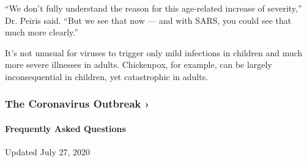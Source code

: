 ``We don't fully understand the reason for this age-related increase of
severity,'' Dr. Peiris said. ``But we see that now --- and with SARS,
you could see that much more clearly.''

It's not unusual for viruses to trigger only mild infections in children
and much more severe illnesses in adults. Chickenpox, for example, can
be largely inconsequential in children, yet catastrophic in adults.

\href{https://www.nytimes.com/news-event/coronavirus?action=click\&pgtype=Article\&state=default\&region=MAIN_CONTENT_3\&context=storylines_faq}{}

\hypertarget{the-coronavirus-outbreak-}{%
\subsubsection{The Coronavirus Outbreak
›}\label{the-coronavirus-outbreak-}}

\hypertarget{frequently-asked-questions}{%
\paragraph{Frequently Asked
Questions}\label{frequently-asked-questions}}

Updated July 27, 2020

